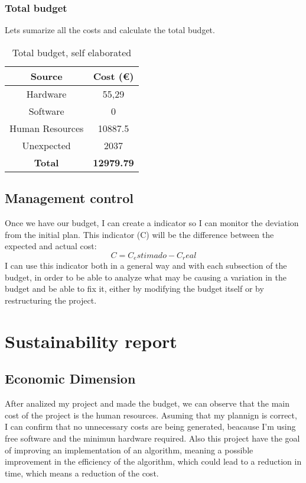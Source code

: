 \subsubsection*{Total budget}
Lets sumarize all the costs and calculate the total budget.
\begin{table}[H]
    \begin{adjustwidth}{-1in}{-1in} %
    \centering
    \begin{tabular}{|c|c|}
    \hline
    \textbf{Source} & \textbf{Cost (€)} \\ 
    \hline
    Hardware &  55,29 \\
    \hline
    Software & 0 \\
    \hline
    Human Resources & 10887.5 \\
    \hline
    Unexpected & 2037 \\
    \hline
    \hline
    \textbf{Total} & \textbf{12979.79}  \\
    \hline
    \end{tabular}
    \caption{Total budget, self elaborated}
    \label{total_budget}
    \end{adjustwidth}
    \end{table}
\subsection{Management control}
Once we have our budget, I can create a indicator so I can monitor the deviation from the initial plan.
This indicator (C) will be the difference between the expected and actual cost:
$$
C = C_estimado - C_real
$$ 
I can use this indicator both in a general way and with each subsection of the budget, in order to be able to analyze what may be causing a variation in the budget and be able to fix it, either by modifying the budget itself or by restructuring the project.
\section{Sustainability report}
\subsection{Economic Dimension}
After analized my project and made the budget, we can observe that the main cost of the project is the human resources.
Asuming that my plannign is correct, I can confirm that no unnecessary costs are being generated, beacause I'm using free software and the minimun hardware required.
Also this project have the goal of improving an implementation of an algorithm, meaning a possible improvement in the efficiency of the algorithm, which could lead to a reduction in time, which means a reduction of the cost.
